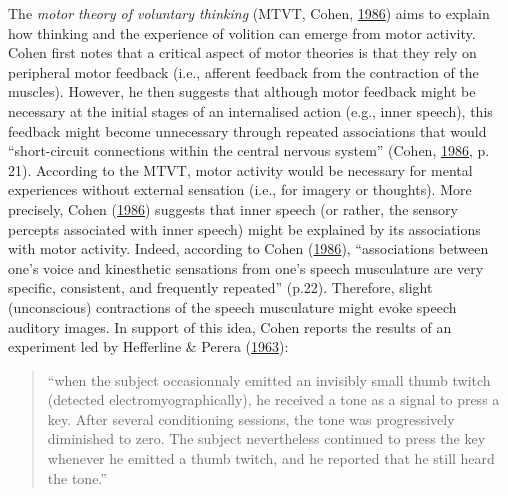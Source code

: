 \documentclass[a4paper,12pt,twoside,onecolumn,openright,final,oldfontcommands]{memoir}
\begin{document}
The \emph{motor theory of voluntary thinking} (MTVT, Cohen, \protect\hyperlink{ref-cohen_motor_1986}{1986}) aims to explain how thinking and the experience of volition can emerge from motor activity. Cohen first notes that a critical aspect of motor theories is that they rely on peripheral motor feedback (i.e., afferent feedback from the contraction of the muscles). However, he then suggests that although motor feedback might be necessary at the initial stages of an internalised action (e.g., inner speech), this feedback might become unnecessary through repeated associations that would \enquote{short-circuit connections within the central nervous system} (Cohen, \protect\hyperlink{ref-cohen_motor_1986}{1986}, p. 21). According to the MTVT, motor activity would be necessary for mental experiences without external sensation (i.e., for imagery or thoughts). More precisely, Cohen (\protect\hyperlink{ref-cohen_motor_1986}{1986}) suggests that inner speech (or rather, the sensory percepts associated with inner speech) might be explained by its associations with motor activity. Indeed, according to Cohen (\protect\hyperlink{ref-cohen_motor_1986}{1986}), \enquote{associations between one's voice and kinesthetic sensations from one's speech musculature are very specific, consistent, and frequently repeated} (p.22). Therefore, slight (unconscious) contractions of the speech musculature might evoke speech auditory images. In support of this idea, Cohen reports the results of an experiment led by Hefferline \& Perera (\protect\hyperlink{ref-hefferline_proprioceptive_1963}{1963}):

\begin{quote}
\enquote{when the subject occasionnaly emitted an invisibly small thumb twitch (detected electromyographically), he received a tone as a signal to press a key. After several conditioning sessions, the tone was progressively diminished to zero. The subject nevertheless continued to press the key whenever he emitted a thumb twitch, and he reported that he still heard the tone.}
\end{quote}
\end{document}
